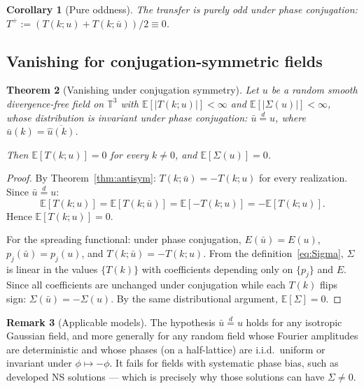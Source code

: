 \documentclass[11pt]{article}
\newtheorem{theorem}{Theorem}[section]
\newtheorem{corollary}[theorem]{Corollary}
\theoremstyle{definition}
\newtheorem{remark}[theorem]{Remark}
\newcommand{\T}{\mathbb{T}}
\newcommand{\E}{\mathbb{E}}
\begin{document}
\begin{corollary}[Pure oddness]
\label{cor:odd}
The transfer is purely odd under phase conjugation:
$T^+ := (T(k;u)+T(k;\bar u))/2 \equiv 0$.
\end{corollary}

\subsection{Vanishing for conjugation-symmetric fields}

\begin{theorem}[Vanishing under conjugation symmetry]
\label{thm:gaussian}
Let $u$ be a random smooth divergence-free field on $\T^3$
with $\E[|T(k;u)|]<\infty$ and $\E[|\Sigma(u)|]<\infty$,
whose distribution is invariant under phase conjugation:
$\bar u \stackrel{d}{=} u$, where
$\hat{\bar u}(k) = \overline{\hat u(k)}$.

Then $\E[T(k;u)]=0$ for every $k\neq 0$, and
$\E[\Sigma(u)]=0$.
\end{theorem}

\begin{proof}
By Theorem~\ref{thm:antisym}: $T(k;\bar u) = -T(k;u)$
for every realization.  Since $\bar u\stackrel{d}{=}u$:
\begin{equation}
\E[T(k;u)] = \E[T(k;\bar u)] = \E[-T(k;u)]
= -\E[T(k;u)].
\end{equation}
Hence $\E[T(k;u)]=0$.

For the spreading functional: under phase conjugation,
$E(\bar u) = E(u)$, $p_j(\bar u)=p_j(u)$, and
$T(k;\bar u) = -T(k;u)$.  From the
definition~\eqref{eq:Sigma}, $\Sigma$ is linear in the
values $\{T(k)\}$ with coefficients depending only on
$\{p_j\}$ and $E$.  Since all coefficients are unchanged
under conjugation while each $T(k)$ flips sign:
$\Sigma(\bar u) = -\Sigma(u)$.  By the same distributional
argument, $\E[\Sigma]=0$.
\end{proof}

\begin{remark}[Applicable models]
The hypothesis $\bar u\stackrel{d}{=}u$ holds for any
isotropic Gaussian field, and more generally for any
random field whose Fourier amplitudes are deterministic
and whose phases (on a half-lattice) are i.i.d.\ uniform
or invariant under $\phi\mapsto -\phi$.  It fails for
fields with systematic phase bias, such as developed
NS solutions --- which is precisely why those solutions
can have $\Sigma\neq 0$.
\end{remark}
\end{document}
